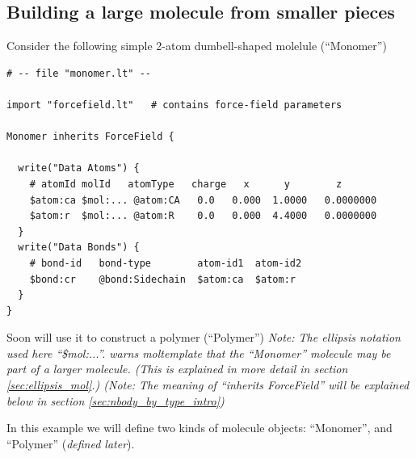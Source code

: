 \documentclass[11pt]{article}
\begin{document}
\pagebreak

\subsection{Building a large molecule from smaller pieces}
\label{sec:2bead}
Consider the following simple 2-atom dumbell-shaped molelule (``Monomer'')
\begin{verbatim}
# -- file "monomer.lt" --

import "forcefield.lt"   # contains force-field parameters

Monomer inherits ForceField {

  write("Data Atoms") {
    # atomId molId   atomType   charge   x      y        z      
    $atom:ca $mol:... @atom:CA   0.0   0.000  1.0000   0.0000000
    $atom:r  $mol:... @atom:R    0.0   0.000  4.4000   0.0000000
  }
  write("Data Bonds") {
    # bond-id   bond-type        atom-id1  atom-id2
    $bond:cr    @bond:Sidechain  $atom:ca  $atom:r
  }
}
\end{verbatim}


Soon will use it to construct a polymer (``Polymer'')
\textit{Note: The ellipsis notation used here ``\$mol:...''.
warns moltemplate that the ``Monomer'' molecule may be part of a larger
molecule.
(This is explained in more detail in section \ref{sec:ellipsis_mol}.)
(Note: The meaning of ``inherits ForceField''
       will be explained below in section \ref{sec:nbody_by_type_intro})
}
       
In this example we will define two kinds of molecule objects:
``Monomer'', and ``Polymer'' (\textit{defined later}).
\end{document}
